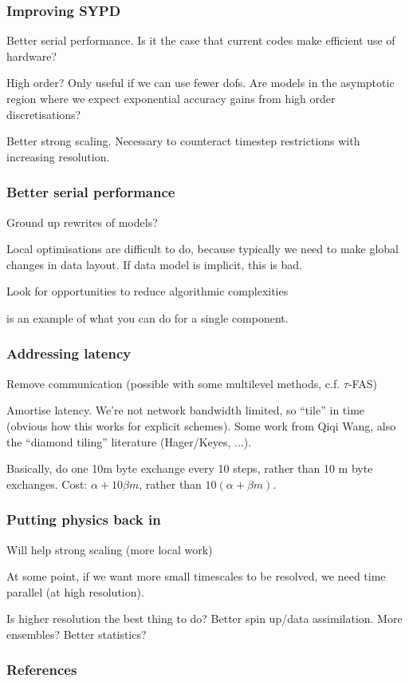 \documentclass[presentation]{beamer}
\begin{document}
\begin{frame}
  \frametitle{Improving SYPD}

  Better serial performance.  Is it the case that current codes make
  efficient use of hardware?

  High order?  Only useful if we can use fewer dofs.  Are models in
  the asymptotic region where we expect exponential accuracy gains
  from high order discretisations?

  Better strong scaling.  Necessary to counteract timestep
  restrictions with increasing resolution.
\end{frame}

\begin{frame}
  \frametitle{Better serial performance}

  Ground up rewrites of models?

  Local optimisations are difficult to do, because typically we need
  to make global changes in data layout.  If data model is implicit,
  this is bad.
  
  Look for opportunities to reduce algorithmic complexities

  \textcite{Yang:2016} is an example of what you can do for a single
  component.
  
\end{frame}

\begin{frame}
  \frametitle{Addressing latency}

  Remove communication (possible with some multilevel methods,
  c.f. $\tau$-FAS)

  Amortise latency.  We're not network bandwidth limited, so ``tile''
  in time (obvious how this works for explicit schemes).  Some work
  from Qiqi Wang, also the ``diamond tiling'' literature (Hager/Keyes,
  ...).

  Basically, do one 10m byte exchange every 10 steps, rather than 10 m
  byte exchanges.  Cost: $\alpha + 10 \beta m$, rather than $10(\alpha
  + \beta m)$.
\end{frame}

\begin{frame}
  \frametitle{Putting physics back in}
  Will help strong scaling (more local work)

  At some point, if we want more small timescales to be resolved, we
  need time parallel (at high resolution).

  Is higher resolution the best thing to do?  Better spin up/data
  assimilation.  More ensembles?  Better statistics?
\end{frame}

\appendix
\begin{frame}[t,allowframebreaks]
  \frametitle{References}
  
  \printbibliography[heading=none]
\end{frame}
\end{document}
